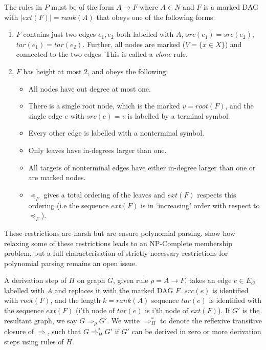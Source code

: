 \documentclass[11pt]{article}
\begin{document}
The rules in $P$ must be of the form $A \rightarrow F$ where $A \in N$ and $F$
is a marked DAG with $|ext(F)| = rank(A)$ that obeys one of the following forms:
\begin{enumerate}
    \item $F$ contains just two edges $e_1, e_2$ both labelled with $A$,
    $src(e_1) = src(e_2)$, $tar(e_1) = tar(e_2)$. Further, all nodes are marked
    ($V = \{x \in X\}$) and connected to the two edges. This is called a
    \textit{clone} rule.
    \item $F$ has height at most 2, and obeys the following:
    \begin{itemize}
        \item All nodes have out degree at most one.
        \item There is a single root node, which is the marked $v = root(F)$,
        and the single edge $e$ with $src(e) = v$ is labelled by a terminal
        symbol. 
        \item Every other edge is labelled with a nonterminal symbol.
        \item Only leaves have in-degrees larger than one.
        \item All targets of nonterminal edges have either in-degree larger than
        one or are marked nodes.
        \item $\preceq_F$ gives a total ordering of the leaves and $ext(F)$
        respects this ordering (i.e the sequence $ext(F)$ is in `increasing'
        order with respect to $\preceq_F$). 
    \end{itemize}
\end{enumerate}

These restrictions are harsh but are ensure polynomial parsing.
\citeauthor{ericson1opdl} show how relaxing some of these restrictions leads to
an NP-Complete membership problem, but a full characterisation of strictly
necessary restrictions for polynomial parsing remains an open issue. 

A derivation step of $H$ on graph $G$, given rule $\rho = A \rightarrow F$,
takes an edge $e \in E_G$ labelled with $A$ and replaces it with the marked DAG
$F$. $src(e)$ is identified with $root(F)$, and the length $k = rank(A)$
sequence $tar(e)$ is identified with the sequence $ext(F)$ (i'th node of
$tar(e)$ is i'th node of $ext(F)$).  If $G'$ is the resultant graph, we say $G
\Rightarrow_\rho G'$. We write $\Rightarrow_H^*$ to denote the reflexive
transitive closure of $\Rightarrow$, such that $G \Rightarrow_H^* G'$ if $G'$
can be derived in zero or more derivation steps using rules of $H$. 
\end{document}
